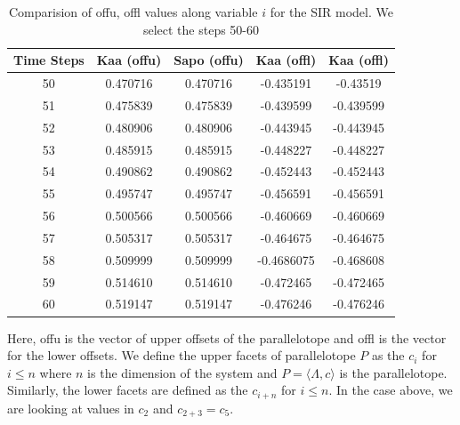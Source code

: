 \documentclass[EPiC]{easychair}
\begin{document}
\begin{table}[h]
\centering
\begin{tabular}{|c c c c c|}
    \hline
    {\bf Time Steps} & {\bf Kaa (offu) }  & { \bf Sapo (offu) } & {\bf Kaa (offl)} & {\bf Kaa (offl) }  \\
    \hline
     50 & 0.470716 & 0.470716 & -0.435191 & -0.43519 \\
  
     51 & 0.475839 & 0.475839 & -0.439599 & -0.439599 \\ 

     52 & 0.480906 & 0.480906 & -0.443945 & -0.443945\\

     53 & 0.485915 &  0.485915 & -0.448227 &  -0.448227 \\ 

     54 & 0.490862 & 0.490862 & -0.452443 & -0.452443 \\ 

     55 & 0.495747 & 0.495747 & -0.456591 & -0.456591 \\

     56 & 0.500566 & 0.500566 & -0.460669 & -0.460669 \\ 

     57 & 0.505317 & 0.505317 & -0.464675 & -0.464675\\ 

     58 & 0.509999 & 0.509999  & -0.4686075 & -0.468608 \\ 

     59 & 0.514610 & 0.514610 & -0.472465 & -0.472465\\

     60 & 0.519147 & 0.519147 & -0.476246 & -0.476246 \\
    \hline
\end{tabular}
\caption{Comparision of offu, offl values along variable $i$ for the SIR model. We select the steps 50-60}
\label{val1}
\end{table}
\noindent Here, offu is the vector of upper offsets of the parallelotope and offl is the vector for the lower offsets. We define the upper facets of parallelotope $P$ as the $c_i$ for $i \leq n$ where $n$ is the dimension of the system and $P = \langle \Lambda, c \rangle$ is the parallelotope. Similarly, the lower facets are defined as the $c_{i+n}$ for $i \leq n$. In the case above, we are looking at values in $c_2$ and $c_{2+3} = c_5$.
\end{document}
